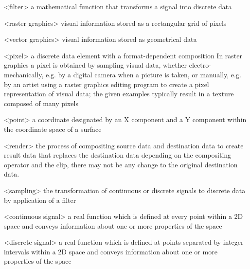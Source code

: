 <filter> a mathematical function that transforms a signal into discrete data

<raster graphics> visual information stored as a rectangular grid of pixels

<vector graphics> visual information stored as geometrical data

<pixel> a discrete data element with a format-dependent composition
\enternote
In raster graphics a pixel is obtained by sampling visual data, whether 
electro-mechanically, e.g. by a digital camera when a picture is taken, or 
manually, e.g. by an artist using a raster graphics editing program to create a 
pixel representation of visual data; the given examples typically result in a 
texture composed of many pixels
\exitnote

<point> a coordinate designated by an X component and a Y component within the 
coordinate space of a surface

<render> the process of compositing source data and destination data to create 
result data that replaces the destination data
\enternote
depending on the compositing operator and the clip, there may not be any change 
to the original destination data.
\exitnote

%
<sampling> the transformation of continuous or discrete signals to discrete 
data by application of a filter

<continuous signal> a real function which is defined at every point within a 
2D space and conveys information about one or more properties of the space

<discrete signal> a real function which is defined at points separated by 
integer intervals within a 2D space and conveys information about one or more 
properties of the space


